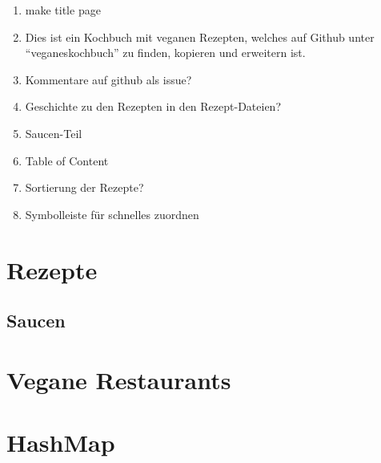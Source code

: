 \documentclass[12pt,a4paper]{article}
\begin{document}
\begin{enumerate}
	\item make title page
	\item Dies ist ein Kochbuch mit veganen Rezepten, welches auf Github unter \enquote{veganeskochbuch} zu finden, kopieren und erweitern ist.\\
	\item Kommentare auf github als issue?
	\item Geschichte zu den Rezepten in den Rezept-Dateien?
	\item Saucen-Teil
	\item Table of Content
	\item Sortierung der Rezepte?
	\item Symbolleiste für schnelles zuordnen
\end{enumerate}
\clearpage
\section{Rezepte}
	
	
	
	
	
	
	
	
	
\subsection[Saucen]{Saucen}
    
    
	
\section{Vegane Restaurants}
	
	
\section{HashMap}
	
\end{document}
